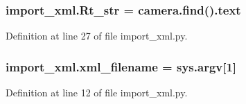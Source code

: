 \subsubsection[{\texorpdfstring{Rt\+\_\+str}{Rt_str}}]{\setlength{\rightskip}{0pt plus 5cm}import\+\_\+xml.\+Rt\+\_\+str = camera.\+find(\textquotesingle{}).text}\hypertarget{namespaceimport__xml_ae9bd125b10e08d1149b3c7ca82baa85f}{}\label{namespaceimport__xml_ae9bd125b10e08d1149b3c7ca82baa85f}


Definition at line 27 of file import\+\_\+xml.\+py.

\subsubsection[{\texorpdfstring{xml\+\_\+filename}{xml_filename}}]{\setlength{\rightskip}{0pt plus 5cm}import\+\_\+xml.\+xml\+\_\+filename = sys.\+argv\mbox{[}1\mbox{]}}\hypertarget{namespaceimport__xml_aaf3ac984b3bbe9ea024af43d503eb08d}{}\label{namespaceimport__xml_aaf3ac984b3bbe9ea024af43d503eb08d}


Definition at line 12 of file import\+\_\+xml.\+py.


